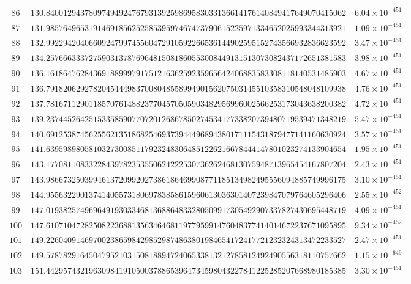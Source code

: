 \documentclass[12pt,reqno]{amsart}
\theoremstyle{remark}
\begin{document}
\begin{longtable}{clc}
$86$ & $130.8400129437809749492476793139259869583033136614176140849417649070415062$ & $6.04\times 10^{-451}$ \\
$87$ & $131.9857649653191469185625258539597467473790615225971334652025993344313921$ & $1.09\times 10^{-451}$ \\
$88$ & $132.9922942040660924799745560472910592266536144902595152743566932836623592$ & $3.47\times 10^{-451}$ \\
$89$ & $134.2576663337275903137876964815081860553008449131513073082437172651381583$ & $3.98\times 10^{-451}$ \\
$90$ & $136.1618647628436918899979175121636259235965642406883583308118140531485903$ & $4.67\times 10^{-451}$ \\
$91$ & $136.7918206292782045444983700804855899490156207503145510358310548048109938$ & $4.76\times 10^{-451}$ \\
$92$ & $137.7816711290118570761488237704570505903482956996002566253173043638200382$ & $4.72\times 10^{-451}$ \\
$93$ & $139.2374452642515335859077072012686785027453417733820739480719539471348219$ & $5.47\times 10^{-451}$ \\
$94$ & $140.6912538745625562135186825469373944496894380171115431879477141160630924$ & $3.57\times 10^{-451}$ \\
$95$ & $141.6395989805810327300851179232483064851226216678444147801023274133904654$ & $1.95\times 10^{-451}$ \\
$96$ & $143.1770811083322843978235355062422253073626246813075948713965454167807204$ & $2.43\times 10^{-451}$ \\
$97$ & $143.9866732503994613720992027386186469908771185134982495556094885749996175$ & $3.10\times 10^{-451}$ \\
$98$ & $144.9556322901374140557318069783858615960613036301407239847079764605296406$ & $2.55\times 10^{-452}$ \\
$99$ & $147.0193825749696491930334681368864833280509917305492907337827430695448719$ & $4.09\times 10^{-451}$ \\
$100$ & $147.6107104728250822368813563464681197795991476048377414014672237671095895$ & $9.34\times 10^{-452}$ \\
$101$ & $149.2260409146970023865984298529874863801984654172417721232324313472233527$ & $2.47\times 10^{-451}$ \\
$102$ & $149.5787829164504795210315081889472406533813212785812492490556318110757662$ & $1.15\times 10^{-649}$ \\
$103$ & $151.4429574321963098419105003788653964734598043227841225285207668980185385$ & $3.30\times 10^{-451}$ \\

\end{longtable}
\end{document}
